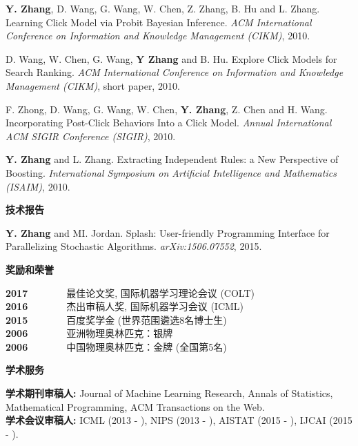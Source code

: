 \documentclass{res}
\begin{document}
\begin{resume}
\begin{enumerate}[label={[C\arabic*]}, ref={C\arabic*}]
\item \textbf{Y. Zhang}, D. Wang, G. Wang, W. Chen, Z. Zhang, B. Hu and L. Zhang. Learning Click Model via Probit Bayesian Inference.
\emph{ACM International Conference on Information and Knowledge Management (CIKM)}, 2010. \label{learning-cikm10}

\item D. Wang, W. Chen, G. Wang, \textbf{Y Zhang} and B. Hu. Explore Click Models for Search Ranking.
\emph{ACM International Conference on Information and Knowledge Management (CIKM)}, short paper, 2010. \label{explore-cikm10}

\item F. Zhong, D. Wang, G. Wang, W. Chen, \textbf{Y. Zhang}, Z. Chen and H. Wang. Incorporating Post-Click Behaviors Into a Click Model.
\emph{Annual International ACM SIGIR Conference (SIGIR)}, 2010. \label{incorporating-sigir10}

\item \textbf{Y. Zhang} and L. Zhang. Extracting Independent Rules: a New Perspective of Boosting. 
\emph{International Symposium on Artificial Intelligence and Mathematics (ISAIM)}, 2010. \label{a-new-isaim10}
\end{enumerate}

{\bf\Large 技术报告}
\vspace{5pt}

\begin{enumerate}[label={[T\arabic*]}, ref={T\arabic*}]
\item \label{splash}\textbf{Y. Zhang} and MI. Jordan. Splash: User-friendly Programming Interface for Parallelizing Stochastic Algorithms. \emph{arXiv:1506.07552}, 2015.
\end{enumerate}

{\Large\bf 奖励和荣誉}

\vspace{-5pt}
\textbf{2017}~~~~~~~~最佳论文奖,  国际机器学习理论会议 (COLT)\\
\textbf{2016}~~~~~~~~杰出审稿人奖,  国际机器学习会议 (ICML)\\
\textbf{2015}~~~~~~~~百度奖学金 (世界范围遴选8名博士生)\\
\textbf{2006}~~~~~~~~亚洲物理奥林匹克：银牌\\
\textbf{2006}~~~~~~~~中国物理奥林匹克：金牌 (全国第5名)


{\Large\bf 学术服务}

\vspace{-5pt}
{\bf 学术期刊审稿人:} Journal of Machine Learning Research, Annals of Statistics, Mathematical Programming, ACM Transactions on the Web. \\
{\bf 学术会议审稿人:} ICML (2013 - ), NIPS (2013 - ), AISTAT (2015 - ), IJCAI (2015 - ).

\end{resume}
\end{document}
